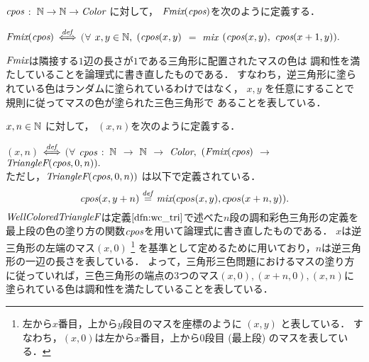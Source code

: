 \begin{dfn}[$\Fmix$]
  $\textit{cpos}$ $:$ $\mathbb{N} \to \mathbb{N} \to \textit{Color}$ に対して，
  $\textit{Fmix}(\textit{cpos})$を次のように定義する．

  $\textit{Fmix}(\textit{cpos})$ $\overset{{\it def}}{\Longleftrightarrow}$
  $(\forall$ $x,y \in\mathbb{N},$
  $(\textit{cpos}(x,y)$ $=$ $\textit{mix}$ $(\textit{cpos}(x,y),$ $\textit{cpos}(x+1,y)).$

  $\Fmix$は隣接する$1$辺の長さが$1$である三角形に配置されたマスの色は
  調和性を満たしていることを論理式に書き直したものである．
  すなわち，逆三角形に塗られている色はランダムに塗られているわけではなく，
  $x,y$ を任意にすることで規則に従ってマスの色が塗られた三色三角形で
  あることを表している．
\end{dfn}

\begin{dfn}[$\WCTF$]
  $x, n \in \mathbb{N}$ に対して，
  \WCTF$(x, n)$を次のように定義する．
  
  \WCT$(x, n)$ $\overset{{\it def}}{\Longleftrightarrow}$
  $(\forall$ $\textit{cpos}$ $:$ $\mathbb{N}$ $\to$ $\mathbb{N}$ $\to$ $\textit{Color},$
  $(\textit{Fmix}(\textit{cpos})$ $\to$ $\textit{TriangleF}(\textit{cpos},0,n)).$ \\
  ただし，$\textit{TriangleF}(\textit{cpos},0,n))$ は以下で定義されている．
  \[
  \textit{cpos}(x,y+n) \overset{{\it def}}{=} \textit{mix}(cpos(x,y),cpos(x+n,y)).
  \]
  $\WCTF$は定義$\ref{dfn:wc_tri}$で述べた$n$段の調和彩色三角形の定義を最上段の色の塗り方の関数$\textit{cpos}$を用いて論理式に書き直したものである．
  $x$は逆三角形の左端のマス$(x,0)$
  \footnote
      {
        左から$x$番目，上から$y$段目のマスを座標のように $(x,y)$ と表している．
        すなわち，$(x,0)$は左から$x$番目，上から$0$段目 (最上段) のマスを表している．
      }
  を基準として定めるために用いており，$n$は逆三角形の一辺の長さを表している．
  よって，三角形三色問題におけるマスの塗り方に従っていれば，三色三角形の端点の$3$つのマス$(x,0), (x+n,0), (x,n)$に塗られている色は調和性を満たしていることを表している．
\end{dfn}

